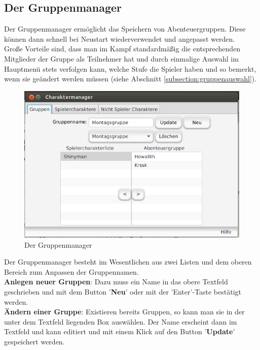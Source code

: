 \documentclass[11pt, a4paper, german]{article}
\begin{document}
\subsection{Der Gruppenmanager}
Der Gruppenmanager ermöglicht das Speichern von Abenteuergruppen. Diese können dann schnell bei Neustart wiederverwendet und angepasst werden.\\
Große Vorteile sind, dass man im Kampf standardmäßig die entsprechenden Mitglieder der Gruppe als Teilnehmer hat und durch einmalige Auswahl im Hauptmenü stets verfolgen kann, welche Stufe die Spieler haben und so bemerkt, wenn sie geändert werden müssen (siehe Abschnitt \ref{subsection:gruppenauswahl}).\\
\begin{figure}
\centering
\includegraphics[width=1\linewidth]{Bilder/Gruppenmanager}
\caption{Der Gruppenmanager}
\label{fig:Gruppenmanager}
\end{figure}

Der Gruppenmanager besteht im Wesentlichen aus zwei Listen und dem oberen Bereich zum Anpassen der Gruppennamen.\\

\textbf{Anlegen neuer Gruppen}: Dazu muss ein Name in das obere Textfeld geschrieben und mit dem Button '\textbf{Neu}' oder mit der 'Enter'-Taste bestätigt werden.\\

\textbf{Ändern einer Gruppe}: Existieren bereits Gruppen, so kann man sie in der unter dem Textfeld liegenden Box auswählen. Der Name erscheint dann im Textfeld und kann editiert und mit einem Klick auf den Button '\textbf{Update}' gespeichert werden. \\
\end{document}

